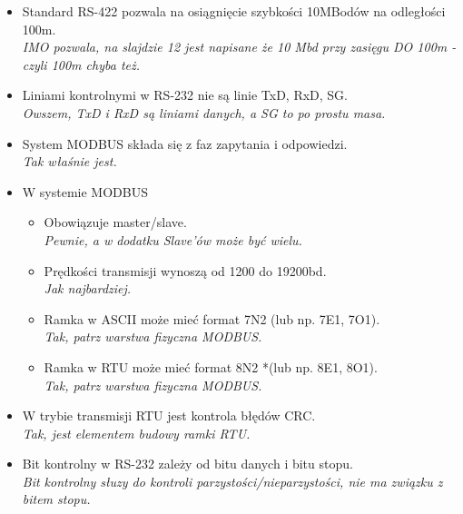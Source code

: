 \begin{itemize}
	\item \textcolor{tak}{Standard RS-422 pozwala na osiągnięcie szybkości 10MBodów na odległości 100m.} \\
	{\small \emph{IMO pozwala, na slajdzie 12 jest napisane że 10 Mbd przy zasięgu DO 100m - czyli 100m chyba też.}}
	
	\item \textcolor{tak}{Liniami kontrolnymi w RS-232 nie są linie TxD, RxD, SG.} \\
	{\small \emph{Owszem, TxD i RxD są liniami danych, a SG to po prostu masa.}}
	
	\item \textcolor{tak}{System MODBUS składa się z faz zapytania i odpowiedzi.} \\
	{\small \emph{Tak właśnie jest.}}
	
	\item {W systemie MODBUS}
	\begin{itemize}
		\item \textcolor{tak}{Obowiązuje master/slave.} \\
		{\small \emph{Pewnie, a w dodatku Slave'ów może być wielu.}}
		
		\item \textcolor{tak}{Prędkości transmisji wynoszą od 1200 do 19200bd.} \\
		{\small \emph{Jak najbardziej.}}
		
		\item \textcolor{tak}{Ramka w ASCII może mieć format 7N2 (lub np. 7E1, 7O1).} \\
		{\small \emph{Tak, patrz warstwa fizyczna MODBUS.}}
		
		\item \textcolor{tak}{Ramka w RTU może mieć format 8N2 *(lub np. 8E1, 8O1).} \\
		{\small \emph{Tak, patrz warstwa fizyczna MODBUS.}}
	\end{itemize} 
	
	
	\item \textcolor{tak}{W trybie transmisji RTU jest kontrola błędów CRC.} \\
	{\small \emph{Tak, jest elementem budowy ramki RTU.}}
	
	\item \textcolor{nie}{Bit kontrolny w RS-232 zależy od bitu danych i bitu stopu.} \\
	{\small \emph{Bit kontrolny słuzy do kontroli parzystości/nieparzystości, nie ma związku z bitem stopu.}}
	

\end{itemize}
